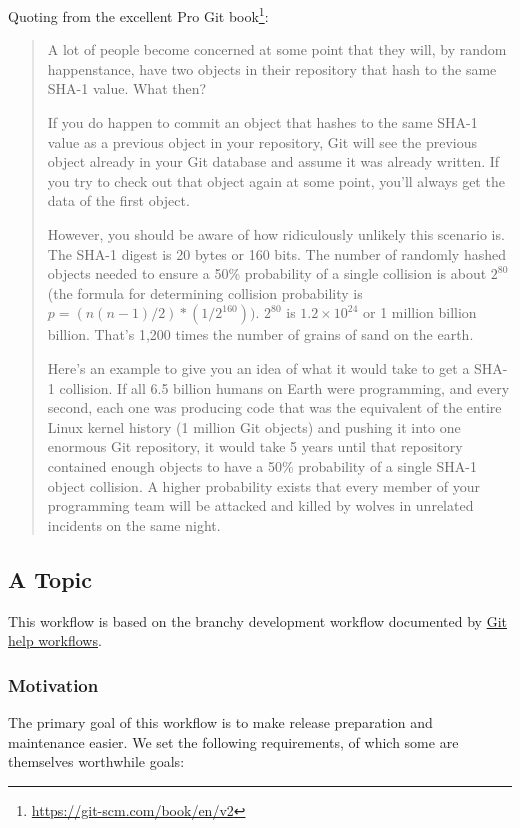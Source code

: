 Quoting from the excellent Pro Git
book\footnote{\url{https://git-scm.com/book/en/v2}}:
\begin{quote}
A lot of people become concerned at some point that they will, by random
happenstance, have two objects in their repository that hash to the same SHA-1
value. What then?

If you do happen to commit an object that hashes to the same SHA-1 value as a
previous object in your repository, Git will see the previous object already in
your Git database and assume it was already written. If you try to check out
that object again at some point, you'll always get the data of the first
object.

However, you should be aware of how ridiculously unlikely this scenario is. The
SHA-1 digest is 20 bytes or 160 bits. The number of randomly hashed objects
needed to ensure a 50\% probability of a single collision is about $2^{80}$ (the
formula for determining collision probability is
$p = (n(n-1)/2) * (1/2^{160}))$. $2^{80}$ is $1.2 \times 10^{24}$ or 1 million
billion billion. That's 1,200 times the number of grains of sand on the earth.

Here's an example to give you an idea of what it would take to get a SHA-1
collision. If all 6.5 billion humans on Earth were programming, and every
second, each one was producing code that was the equivalent of the entire
Linux kernel history (1 million Git objects) and pushing it into one enormous
Git repository, it would take 5 years until that repository contained enough
objects to have a 50\% probability of a single SHA-1 object collision. A higher
probability exists that every member of your programming team will be attacked
and killed by wolves in unrelated incidents on the same night.
\end{quote}


\subsection{A Topic}
\label{subsec:ATopic}

This workflow is based on the branchy development workflow documented by
\href{https://git-scm.com/docs/gitworkflows}{Git help workflows}.


\subsubsection{Motivation}
\label{subsubsec:Motivation}

The primary goal of this workflow is to make release preparation and maintenance
easier. We set the following requirements, of which some are themselves
worthwhile goals:

